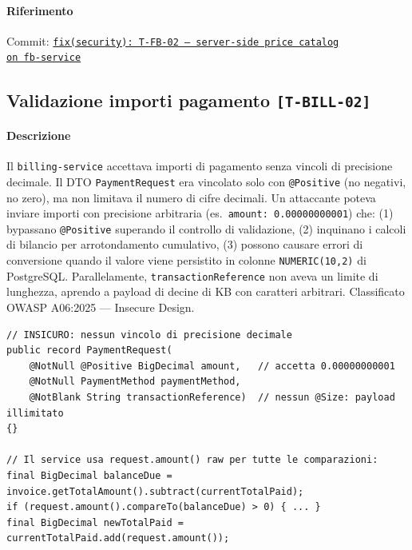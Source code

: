 ﻿\documentclass[a4paper,12pt]{report}
\newcommand{\commitref}[2]{\texttt{\small \href{https://github.com/diegoandruccioli/hotel-pms/commit/#1}{#2}}}
\newcommand{\threat}[1]{\texttt{\small\textcolor{vulnred}{[#1]}}}
\begin{document}
\paragraph{Riferimento} Commit: \commitref{d7af61c}{fix(security): T-FB-02 --- server-side price catalog \\
on fb-service}

\subsection{Validazione importi pagamento \threat{T-BILL-02}}

\paragraph{Descrizione}
Il \texttt{billing-service} accettava importi di pagamento senza vincoli di
precisione decimale. Il DTO \texttt{PaymentRequest} era vincolato solo con
\texttt{@Positive} (no negativi, no zero), ma non limitava il numero di cifre
decimali. Un attaccante poteva inviare importi con precisione arbitraria
(es.\ \texttt{amount: 0.00000000001}) che: (1) bypassano \texttt{@Positive}
superando il controllo di validazione, (2) inquinano i calcoli di bilancio
per arrotondamento cumulativo, (3) possono causare errori di conversione
quando il valore viene persistito in colonne \texttt{NUMERIC(10,2)} di PostgreSQL.
Parallelamente, \texttt{transactionReference} non aveva un limite di lunghezza,
aprendo a payload di decine di KB con caratteri arbitrari.
Classificato OWASP A06:2025 --- Insecure Design.

\begin{insecurebox}[title={Codice Vulnerabile --- PaymentRequest.java (baseline)}]
\begin{lstlisting}[style=java]
// INSICURO: nessun vincolo di precisione decimale
public record PaymentRequest(
    @NotNull @Positive BigDecimal amount,   // accetta 0.00000000001
    @NotNull PaymentMethod paymentMethod,
    @NotBlank String transactionReference)  // nessun @Size: payload illimitato
{}

// Il service usa request.amount() raw per tutte le comparazioni:
final BigDecimal balanceDue = invoice.getTotalAmount().subtract(currentTotalPaid);
if (request.amount().compareTo(balanceDue) > 0) { ... }
final BigDecimal newTotalPaid = currentTotalPaid.add(request.amount());
\end{lstlisting}
\end{insecurebox}
\end{document}
